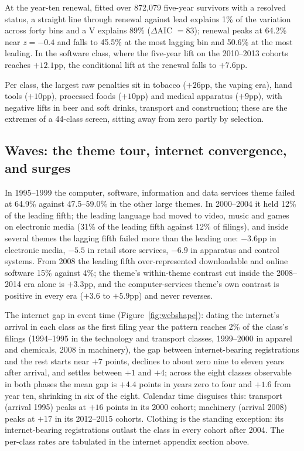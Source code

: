 At the year-ten renewal, fitted over 872{,}079 five-year survivors with a
resolved status, a straight line through renewal against lead explains
1\% of the variation across forty bins and a V explains 89\%
($\Delta$AIC $= 83$); renewal peaks at 64.2\% near $z = -0.4$ and falls
to 45.5\% at the most lagging bin and 50.6\% at the most leading. In the
software class, where the five-year lift on the 2010--2013 cohorts
reaches $+12.1$pp, the conditional lift at the renewal falls to
$+7.6$pp.

Per class, the largest raw penalties sit in tobacco ($+26$pp, the vaping
era), hand tools ($+10$pp), processed foods ($+10$pp) and medical
apparatus ($+9$pp), with negative lifts in beer and soft drinks,
transport and construction; these are the extremes of a 44-class screen,
sitting away from zero partly by selection.

\subsection{Waves: the theme tour, internet convergence, and surges}

In 1995--1999 the computer, software, information and data services theme
failed at 64.9\% against 47.5--59.0\% in the other large themes. In
2000--2004 it held 12\% of the leading fifth; the leading language had
moved to video, music and games on electronic media (31\% of the leading
fifth against 12\% of filings), and inside several themes the lagging
fifth failed more than the leading one: $-3.6$pp in electronic media,
$-5.5$ in retail store services, $-6.9$ in apparatus and control systems.
From 2008 the leading fifth over-represented downloadable and online
software 15\% against 4\%; the theme's within-theme contrast cut inside
the 2008--2014 era alone is $+3.3$pp, and the computer-services theme's
own contrast is positive in every era ($+3.6$ to $+5.9$pp) and never
reverses.

The internet gap in event time (Figure~\ref{fig:webshape}): dating the
internet's arrival in each class as the first filing year the pattern
reaches 2\% of the class's filings (1994--1995 in the technology and
transport classes, 1999--2000 in apparel and chemicals, 2008 in
machinery), the gap between internet-bearing registrations and the rest
starts near $+7$ points, declines to about zero nine to eleven years
after arrival, and settles between $+1$ and $+4$; across the eight
classes observable in both phases the mean gap is $+4.4$ points in years
zero to four and $+1.6$ from year ten, shrinking in six of the eight.
Calendar time disguises this: transport (arrival 1995) peaks at $+16$
points in its 2000 cohort; machinery (arrival 2008) peaks at $+17$ in its
2012--2015 cohorts. Clothing is the standing exception: its
internet-bearing registrations outlast the class in every cohort after
2004. The per-class rates are tabulated in the internet appendix section
above.

